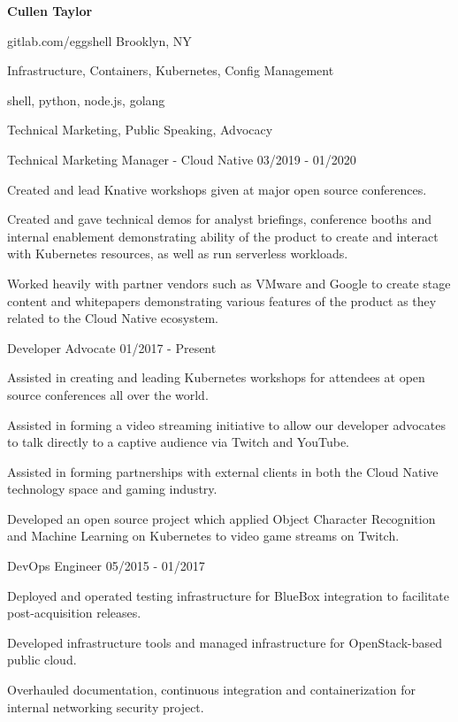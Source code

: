 \documentclass[12pt]{article} %
\begin{document}
\centerline{{\Huge \bf Cullen Taylor}}
\bigskip

        {gitlab.com/eggshell}
        {Brooklyn, NY}
        {}


      {Infrastructure, Containers, Kubernetes, Config Management}

      {shell, python, node.js, golang}

      {Technical Marketing, Public Speaking, Advocacy}


\begin{description}
{}
           {Technical Marketing Manager - Cloud Native}
           {03/2019 - 01/2020}

Created and lead Knative workshops given at major open source conferences.

Created and gave technical demos for analyst briefings, conference booths and
internal enablement demonstrating ability of the product to create and interact
with Kubernetes resources, as well as run serverless workloads.

Worked heavily with partner vendors such as VMware and Google to create stage
content and whitepapers demonstrating various features of the product as they
related to the Cloud Native ecosystem.

           {Developer Advocate}
           {01/2017 - Present}

Assisted in creating and leading Kubernetes workshops for attendees at open
source conferences all over the world.

Assisted in forming a video streaming initiative to allow our developer
advocates to talk directly to a captive audience via Twitch and YouTube.

Assisted in forming partnerships with external clients in both the Cloud Native
technology space and gaming industry.

Developed an open source project which applied Object Character Recognition
and Machine Learning on Kubernetes to video game streams on Twitch.

           {DevOps Engineer}
           {05/2015 - 01/2017}

Deployed and operated testing infrastructure for BlueBox integration to
facilitate post-acquisition releases.

Developed infrastructure tools and managed infrastructure for OpenStack-based
public cloud.

Overhauled documentation, continuous integration and containerization for
internal networking security project.
\end{description}
\end{document}
